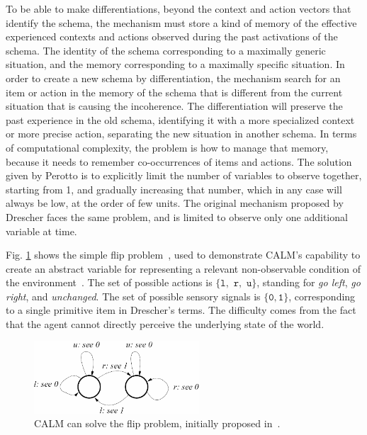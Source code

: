 \documentclass[runningheads]{llncs}
\begin{document}
To be able to make differentiations, beyond the context and action vectors that identify the schema, the mechanism must store a kind of memory of the effective experienced contexts and actions observed during the past activations of the schema.
The identity of the schema corresponding to a maximally generic situation, and the memory corresponding to a maximally specific situation.
In order to create a new schema by differentiation, the mechanism search for an item or action in the memory of the schema that is different from the current situation that is causing the incoherence. 
The differentiation will preserve the past experience in the old schema, identifying it with a more specialized context or more precise action, separating the new situation in another schema.
In terms of computational complexity, the problem is how to manage that memory, because it needs to remember co-occurrences of items and actions.
The solution given by Perotto is to explicitly limit the number of variables to observe together, starting from 1, and gradually increasing that number, which in any case will always be low, at the order of few units.
The original mechanism proposed by Drescher faces the same problem, and is limited to observe only one additional variable at time.

Fig. \ref{fig:perotto_ben} shows the simple flip problem~\cite{Singh:2003:ICML}, used to demonstrate CALM's capability to create an abstract variable for representing a relevant non-observable condition of the environment~\cite{Perotto:2007:EpiRob}.
The set of possible actions is $\{\texttt{l},$ $\texttt{r},$ $\texttt{u}\}$, standing for \textit{go left}, \textit{go right}, and \textit{unchanged}.
The set of possible sensory signals is $\{\texttt{0}, \texttt{1}\}$, corresponding to a single primitive item in Drescher's terms.
The difficulty comes from the fact that the agent cannot directly perceive the underlying state of the world. 

\begin{figure}
	\centering
	\includegraphics[width=0.55\textwidth]{Figure_flip_problem.png}
	\caption{CALM can solve the flip problem, initially proposed in~\cite{Singh:2003:ICML}.} 
	\label{fig:perotto_ben}
\end{figure}
\end{document}
